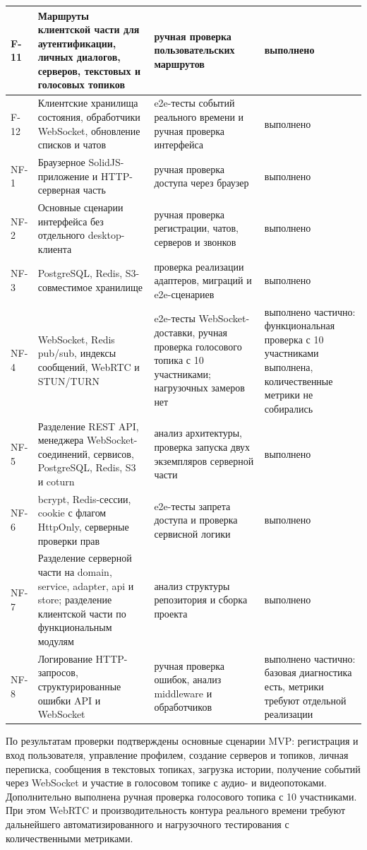 \documentclass[a4paper,12pt]{extarticle}
\begin{document}
\begin{longtable}{|>{\raggedright\arraybackslash}p{2.7cm}|>{\raggedright\arraybackslash}p{4.7cm}|>{\raggedright\arraybackslash}p{4.1cm}|>{\raggedright\arraybackslash}p{4.1cm}|}
\hline
F-11 & Маршруты клиентской части для аутентификации, личных диалогов, серверов, текстовых и голосовых топиков & ручная проверка пользовательских маршрутов & выполнено \\
\hline
F-12 & Клиентские хранилища состояния, обработчики WebSocket, обновление списков и чатов & e2e-тесты событий реального времени и ручная проверка интерфейса & выполнено \\
\hline
NF-1 & Браузерное SolidJS-приложение и HTTP-серверная часть & ручная проверка доступа через браузер & выполнено \\
\hline
NF-2 & Основные сценарии интерфейса без отдельного desktop-клиента & ручная проверка регистрации, чатов, серверов и звонков & выполнено \\
\hline
NF-3 & PostgreSQL, Redis, S3-совместимое хранилище & проверка реализации адаптеров, миграций и e2e-сценариев & выполнено \\
\hline
NF-4 & WebSocket, Redis pub/sub, индексы сообщений, WebRTC и STUN/TURN & e2e-тесты WebSocket-доставки, ручная проверка голосового топика с 10 участниками; нагрузочных замеров нет & выполнено частично: функциональная проверка с 10 участниками выполнена, количественные метрики не собирались \\
\hline
NF-5 & Разделение REST API, менеджера WebSocket-соединений, сервисов, PostgreSQL, Redis, S3 и coturn & анализ архитектуры, проверка запуска двух экземпляров серверной части & выполнено \\
\hline
NF-6 & bcrypt, Redis-сессии, cookie с флагом HttpOnly, серверные проверки прав & e2e-тесты запрета доступа и проверка сервисной логики & выполнено \\
\hline
NF-7 & Разделение серверной части на domain, service, adapter, api и store; разделение клиентской части по функциональным модулям & анализ структуры репозитория и сборка проекта & выполнено \\
\hline
NF-8 & Логирование HTTP-запросов, структурированные ошибки API и WebSocket & ручная проверка ошибок, анализ middleware и обработчиков & выполнено частично: базовая диагностика есть, метрики требуют отдельной реализации \\
\hline
\end{longtable}

По результатам проверки подтверждены основные сценарии MVP: регистрация и вход пользователя, управление профилем, создание серверов и топиков, личная переписка, сообщения в текстовых топиках, загрузка истории, получение событий через WebSocket и участие в голосовом топике с аудио- и видеопотоками. Дополнительно выполнена ручная проверка голосового топика с 10 участниками. При этом WebRTC и производительность контура реального времени требуют дальнейшего автоматизированного и нагрузочного тестирования с количественными метриками.
\end{document}
